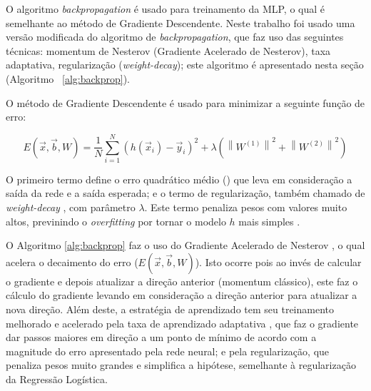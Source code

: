 \documentclass[12pt,a4paper,utf8]{ppgsi}
\begin{document}
O algoritmo \textit{backpropagation} é usado para treinamento da MLP, o qual é semelhante ao método de Gradiente Descendente. Neste trabalho foi usado uma versão modificada do algoritmo de \textit{backpropagation}, que faz uso das seguintes técnicas: momentum de Nesterov (Gradiente Acelerado de Nesterov), taxa adaptativa, regularização (\textit{weight-decay}); este algoritmo é apresentado nesta seção (Algoritmo ~\ref{alg:backprop}).

O método de Gradiente Descendente é usado para minimizar a seguinte função de erro:

\begin{dmath*} \label{eq:errMLP}
    E(\vec{x}, \vec{b}, W) = \frac{1}{N} \sum^N_{i=1} (h(\vec{x}_i) - \vec{y}_i)^2 + \lambda \left( \left\lVert W^{(1)} \right\rVert^2 + \left\lVert W^{(2)} \right\rVert^2 \right)
\end{dmath*}

O primeiro termo define o erro quadrático médio (\citep{haykin2009neural}) que leva em consideração a saída da rede e a saída esperada; e o termo de regularização, também chamado de \textit{weight-decay} \citep{haykin2009neural}, com parâmetro $\lambda$. Este termo penaliza pesos com valores muito altos, previnindo o \textit{overfitting} por tornar o modelo $h$ mais simples \citep{Hinton89}.

O Algoritmo \ref{alg:backprop} faz o uso do Gradiente Acelerado de Nesterov \citep{SutskeverMartensDahlHinton_icml2013}, o qual acelera o decaimento do erro ($E(\vec{x}, \vec{b}, W)$). Isto ocorre pois ao invés de calcular o gradiente e depois atualizar a direção anterior (momentum clássico), este faz o cálculo do gradiente levando em consideração a direção anterior para atualizar a nova direção. Além deste, a estratégia de aprendizado tem seu treinamento melhorado e acelerado pela taxa de aprendizado adaptativa \citep{haykin2009neural}, que faz o gradiente dar passos maiores em direção a um ponto de mínimo de acordo com a magnitude do erro apresentado pela rede neural; e pela regularização, que penaliza pesos muito grandes e simplifica a hipótese, semelhante à regularização da Regressão Logística.
\end{document}
